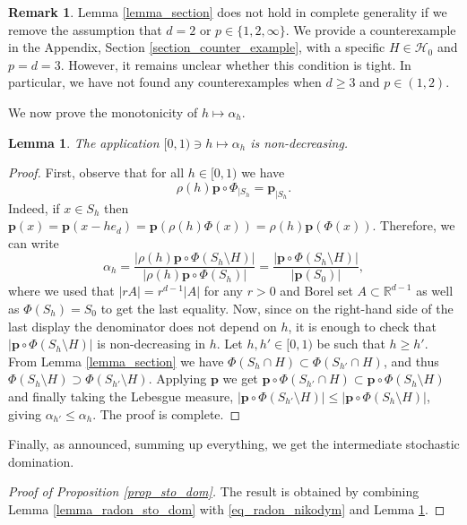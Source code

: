 \documentclass[a4paper, 11pt]{article}
\theoremstyle{plain}
\newtheorem{Lemma}[Theorem]{Lemma}
\theoremstyle{definition}
\newtheorem{Remark}[Theorem]{Remark}
\newcommand{\R}{\mathbb{R}}
\numberwithin{equation}{section}
\begin{document}
\begin{Remark}
    Lemma \ref{lemma_section} does not hold in complete generality if we remove the assumption that $d=2$ or $p\in\{1,2,\infty\}$. We provide a counterexample in the Appendix, Section \ref{section_counter_example}, with a specific $H\in\mathcal H_0$ and $p=d=3$. However, it remains unclear whether this condition is tight. In particular, we have not found any counterexamples when $d\geq3$ and $p\in(1, 2)$.
\end{Remark}


We now prove the monotonicity of $h\mapsto\alpha_h$.


\begin{Lemma}
    \label{lemma_mono_alpha}
    The application $[0,1)\ni h\mapsto\alpha_h$ is non-decreasing.
\end{Lemma}

\begin{proof}
    First, observe that for all $h\in[0,1)$ we have
        \[\rho(h)\mathbf p\circ\Phi_{\vert S_h}=\mathbf p_{\vert S_h}.\]
    Indeed, if $x\in S_h$ then $\mathbf p(x)=\mathbf p(x-he_d)=\mathbf p(\rho(h)\Phi(x))=\rho(h)\mathbf p(\Phi(x))$. Therefore, we can write
        \[\alpha_h=\frac{|\rho(h)\mathbf p\circ\Phi(S_h\setminus H)|}{|\rho(h) \mathbf p\circ\Phi(S_h)|}=\frac{|\mathbf p\circ\Phi(S_h\setminus H)|}{|\mathbf p(S_0)|},\]
    where we used that $|rA|=r^{d-1}|A|$ for any $r>0$ and Borel set $A\subset\R^{d-1}$ as well as $\Phi(S_h)=S_0$ to get the last equality. Now, since on the right-hand side of the last display the denominator does not depend on $h$, it is enough to check that $|\mathbf p\circ\Phi(S_h\setminus H)|$ is non-decreasing in $h$. Let $h, h'\in[0,1)$ be such that $h\geq h'$. From Lemma \ref{lemma_section} we have $\Phi(S_h\cap H)\subset\Phi(S_{h'}\cap H)$, and thus $\Phi(S_h\setminus H)\supset\Phi(S_{h'}\setminus H)$. Applying $\mathbf p$ we get $\mathbf p\circ\Phi(S_{h'}\cap H)\subset \mathbf p\circ\Phi(S_h\setminus H)$ and finally taking the Lebesgue measure, $|\mathbf p\circ\Phi(S_{h'}\setminus H)|\leq|\mathbf p\circ\Phi(S_h\setminus H)|$, giving $\alpha_{h'}\leq\alpha_h$. The proof is complete.
\end{proof}


Finally, as announced, summing up everything, we get the intermediate stochastic domination.


\begin{proof}[Proof of Proposition \ref{prop_sto_dom}]
    The result is obtained by combining Lemma \ref{lemma_radon_sto_dom} with \eqref{eq_radon_nikodym} and Lemma \ref{lemma_mono_alpha}.
\end{proof}
\end{document}
